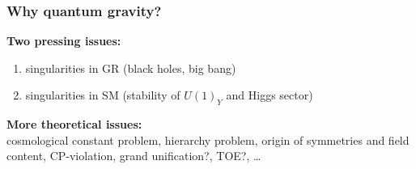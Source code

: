 \documentclass[]{beamer}  %
\begin{document}
\begin{frame}
  \frametitle{Why quantum gravity?}
  \textbf{Two pressing issues:}
  \begin{enumerate}
    \item singularities in GR (black holes, big bang)
      \hspace{2cm}
    \item singularities in SM (stability of $U(1)_Y$ and Higgs sector)
  \end{enumerate}
  \vfill
  \pause
  \textbf{More theoretical issues:}\\[5pt]
  cosmological constant problem, hierarchy problem, origin of symmetries and field content,
  CP-violation, grand unification?, TOE?, \dots
\end{frame}
\end{document}
